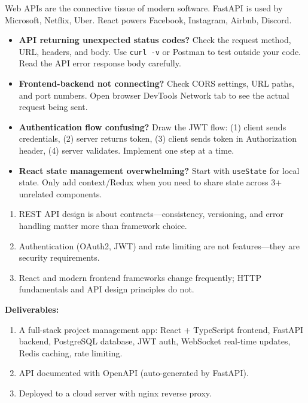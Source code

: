 \documentclass[11pt, a4paper, oneside]{report}
\begin{document}
\begin{realworldbox}
Web APIs are the connective tissue of modern software. FastAPI is used by Microsoft, Netflix, Uber. React powers Facebook, Instagram, Airbnb, Discord.
\end{realworldbox}


\begin{stuckbox}
\begin{itemize}[leftmargin=*]
\item \textbf{API returning unexpected status codes?} Check the request method, URL, headers, and body. Use \texttt{curl -v} or Postman to test outside your code. Read the API error response body carefully.
\item \textbf{Frontend-backend not connecting?} Check CORS settings, URL paths, and port numbers. Open browser DevTools Network tab to see the actual request being sent.
\item \textbf{Authentication flow confusing?} Draw the JWT flow: (1) client sends credentials, (2) server returns token, (3) client sends token in Authorization header, (4) server validates. Implement one step at a time.
\item \textbf{React state management overwhelming?} Start with \texttt{useState} for local state. Only add context/Redux when you need to share state across 3+ unrelated components.
\end{itemize}
\end{stuckbox}


\begin{takeawaybox}
\begin{enumerate}[leftmargin=*]
\item REST API design is about contracts---consistency, versioning, and error handling matter more than framework choice.
\item Authentication (OAuth2, JWT) and rate limiting are not features---they are security requirements.
\item React and modern frontend frameworks change frequently; HTTP fundamentals and API design principles do not.
\end{enumerate}
\end{takeawaybox}

\begin{milestonebox}
\textbf{Deliverables:}
\begin{enumerate}[leftmargin=*]
\item A full-stack project management app: React + TypeScript frontend, FastAPI backend, PostgreSQL database, JWT auth, WebSocket real-time updates, Redis caching, rate limiting.
\item API documented with OpenAPI (auto-generated by FastAPI).
\item Deployed to a cloud server with nginx reverse proxy.
\end{enumerate}
\end{milestonebox}
\end{document}
